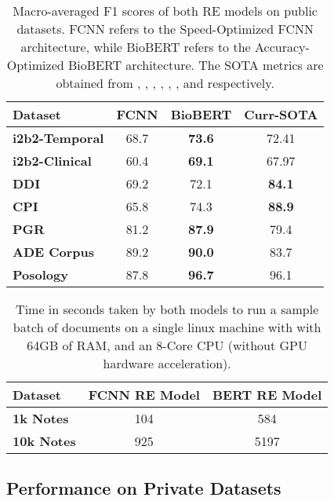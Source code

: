 \documentclass[letterpaper]{article}
\begin{document}
\begin{table}[ht]
\centering
\begin{tabular}{ lccc }
\toprule
\textbf{Dataset} & \textbf{FCNN} & \textbf{BioBERT} & \textbf{Curr-SOTA} \\
\midrule
\textbf{i2b2-Temporal} & 68.7 & \textbf{73.6} & 72.41\\
\textbf{i2b2-Clinical} & 60.4 & \textbf{69.1} & 67.97\\
\textbf{DDI} & 69.2 & 72.1 & \textbf{84.1}\\
\textbf{CPI} & 65.8 & 74.3 & \textbf{88.9}\\
\textbf{PGR} & 81.2 & \textbf{87.9} & 79.4\\
\textbf{ADE Corpus} & 89.2 & \textbf{90.0} & 83.7\\
\textbf{Posology} & 87.8 & \textbf{96.7} & 96.1\\
\bottomrule
\end{tabular}
\caption{Macro-averaged F1 scores of both RE models on public datasets. FCNN refers to the Speed-Optimized FCNN architecture, while BioBERT refers to the Accuracy-Optimized BioBERT architecture. The SOTA metrics are obtained from \cite{DBLP:journals/corr/abs-2004-06216}, \cite{DBLP:journals/corr/abs-1903-09941}, \cite{10.1093/bioinformatics/btaa907}, \cite{DBLP:journals/corr/abs-2106-03598}, \cite{DBLP:journals/corr/abs-2001-07139}, \cite{DBLP:journals/corr/abs-2002-06424}, and \cite{DBLP:journals/corr/abs-2107-08957} respectively.}
\label{tab:pub_metrics}
\end{table}

\begin{table}[ht]
\centering
\begin{tabular}{ lcc}
\toprule
\textbf{Dataset} & \textbf{FCNN RE Model} & \textbf{BERT RE Model} \\
\midrule
\textbf{1k Notes} & 104 & 584\\
\textbf{10k Notes} & 925 & 5197\\
\bottomrule
\end{tabular}
\caption{Time in seconds taken by both models to run a sample batch of documents on a single linux machine with with 64GB of RAM, and an 8-Core CPU (without GPU hardware acceleration).}
\label{tab:speed_comp}
\end{table}


\subsection{Performance on Private Datasets}
\end{document}
